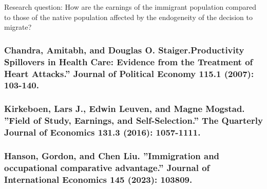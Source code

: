 \documentclass{article}
\begin{document}
Research question: How are the earnings of the immigrant population compared to those of the native population affected by the endogeneity of the decision to migrate?


\subsubsection{Chandra, Amitabh, and Douglas O. Staiger.Productivity Spillovers in Health Care: Evidence
from the Treatment of Heart Attacks.” Journal of Political Economy 115.1 (2007): 103-140.}

\subsubsection{Kirkeboen, Lars J., Edwin Leuven, and Magne Mogstad. ”Field of Study, Earnings, and
Self-Selection.” The Quarterly Journal of Economics 131.3 (2016): 1057-1111.}

\subsubsection{Hanson, Gordon, and Chen Liu. ”Immigration and occupational comparative advantage.”
Journal of International Economics 145 (2023): 103809.}
\end{document}
